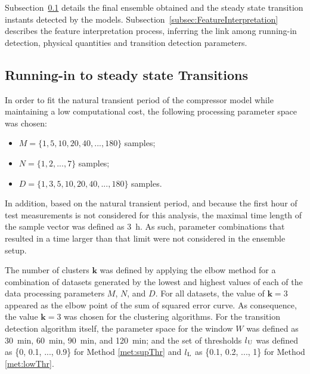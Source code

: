 \documentclass[preprint,11pt,number]{elsarticle}
\begin{document}
Subsection~\ref{subsec:DetectionOfStateTransition} details the final ensemble obtained and the steady state transition instants detected by the models. Subsection~\ref{subsec:FeatureInterpretation} describes the feature interpretation process, inferring the link among running-in detection, physical quantities and transition detection parameters.

\subsection{Running-in to steady state Transitions}\label{subsec:DetectionOfStateTransition}

In order to fit the natural transient period of the compressor model while maintaining a low computational cost, the following processing parameter space was chosen:

\begin{itemize}
    \item $M = \{1, 5, 10, 20, 40, ..., 180\}$ samples;
    \item $N = \{1, 2, ..., 7\}$ samples;
    \item $D = \{1, 3, 5, 10, 20, 40, ..., 180\}$ samples.
\end{itemize}

In addition, based on the natural transient period, and because the first hour of test measurements is not considered for this analysis, the maximal time length of the sample vector was defined as \SI{3}{\hour}. As such, parameter combinations that resulted in a time larger than that limit were not considered in the ensemble setup. 

The number of clusters $\bm{k}$ was defined by applying the elbow method for a combination of datasets generated by the lowest and highest values of each of the data processing parameters $M$, $N$, and $D$. For all datasets, the value of $\bm{k} = 3$ appeared as the elbow point of the sum of squared error curve. As consequence, the value $\bm{k} = 3$ was chosen for the clustering algorithms. For the transition detection algorithm itself, the parameter space for the window $W$ was defined as \SI{30}{\minute}, \SI{60}{\minute}, \SI{90}{\minute}, and \SI{120}{\minute}; and the set of thresholds $l\textsubscript{U}$ was defined as \{0, 0.1, ..., 0.9\} for Method \ref{met:supThr} and $l\textsubscript{L}$ as \{0.1, 0.2, ..., 1\} for Method \ref{met:lowThr}. %
\end{document}
